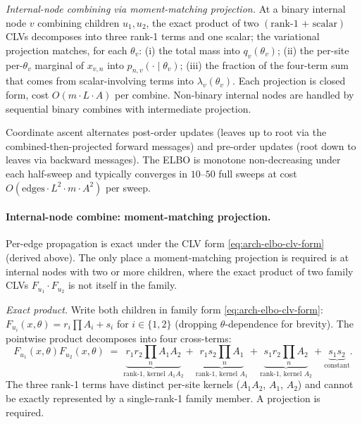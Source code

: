 \emph{Internal-node combining via moment-matching projection.} At a
binary internal node $v$ combining children $u_1, u_2$, the exact
product of two $(\text{rank-1 + scalar})$ CLVs decomposes into three
rank-1 terms and one scalar; the variational projection matches, for
each $\theta_v$: (i) the total mass into $q_v(\theta_v)$; (ii)
the per-site per-$\theta_v$ marginal of $x_{v, n}$ into
$p_{n, v}(\cdot \mid \theta_v)$; (iii) the fraction of the four-term
sum that comes from scalar-involving terms into $\lambda_v(\theta_v)$.
Each projection is closed form, cost $O(m \cdot L \cdot A)$
per combine. Non-binary internal nodes are handled by sequential
binary combines with intermediate projection.

Coordinate ascent alternates post-order updates (leaves up to root
via the combined-then-projected forward messages) and pre-order
updates (root down to leaves via backward messages). The ELBO is
monotone non-decreasing under each half-sweep and typically converges
in $10$--$50$ full sweeps at cost $O(\text{edges} \cdot L^2 \cdot
m \cdot A^2)$ per sweep.

\paragraph{Internal-node combine: moment-matching projection.}
\label{par:arch-phylo-elbo-mmedge}

Per-edge propagation is exact under the CLV form
\eqref{eq:arch-elbo-clv-form} (derived above). The only place a
moment-matching projection is required is at internal nodes with two
or more children, where the exact product of two family CLVs
$F_{u_1} \cdot F_{u_2}$ is not itself in the family.

\emph{Exact product.} Write both children in family form
\eqref{eq:arch-elbo-clv-form}: $F_{u_i}(x, \theta) = r_i \prod A_i + s_i$
for $i \in \{1, 2\}$ (dropping $\theta$-dependence for brevity). The
pointwise product decomposes into four cross-terms:
\begin{equation}
F_{u_1}(x, \theta) F_{u_2}(x, \theta)
    \;=\; \underbrace{r_1 r_2 \prod_n A_1 A_2}_{\text{rank-1, kernel } A_1 A_2}
      + \underbrace{r_1 s_2 \prod_n A_1}_{\text{rank-1, kernel } A_1}
      + \underbrace{s_1 r_2 \prod_n A_2}_{\text{rank-1, kernel } A_2}
      + \underbrace{s_1 s_2}_{\text{constant}}.
\label{eq:arch-mmcombine-exact}
\end{equation}
The three rank-1 terms have distinct per-site kernels
($A_1 A_2$, $A_1$, $A_2$) and cannot be exactly represented by a
single-rank-1 family member. A projection is required.

